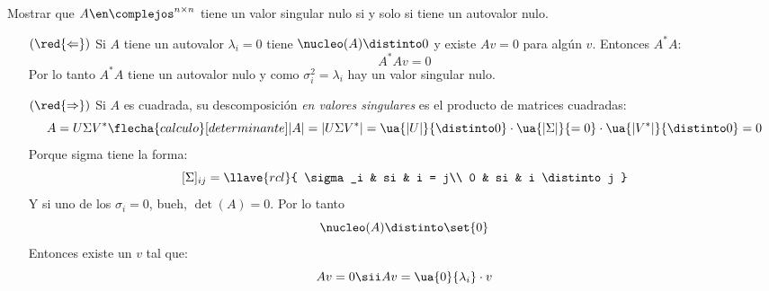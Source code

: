 \begin{enunciado}{\ejercicio}
  Mostrar que $A \en \complejos^{n \times n}$ tiene un valor singular nulo si y solo si tiene un autovalor nulo.
\end{enunciado}
\begin{itemize}
  \item[$(\red{\Leftarrow})$]
        Si $A$ tiene un autovalor $\lambda_i = 0$ tiene $\nucleo(A) \distinto 0$ y existe $Av = 0$ para algún $v$.
        Entonces $A^*A$:
        $$
          A^* A v = 0
        $$
        Por lo tanto $A^*A$ tiene un autovalor nulo y como $\sigma_i^2 = \lambda_i$ hay un valor singular nulo.

  \item[$(\red{\Rightarrow})$]
        Si $A$ es cuadrada, su descomposición \textit{en valores singulares} es el producto de matrices cuadradas:
        $$
          A = U \Sigma V^*
          \flecha{calculo}[determinante]
          |A| =
          |U \Sigma V^*| =
          \ua{|U|}{\distinto 0} \cdot \ua{|\Sigma|}{= 0} \cdot \ua{|V^*|}{\distinto 0} = 0
        $$
        Porque sigma tiene la forma:
        $$
          [\Sigma]_{ij} =
          \llave{rcl}{
            \sigma_i & si & i = j\\
            0 & si & i \distinto j
          }
        $$
        Y si uno de los $\sigma_i = 0$, bueh, $\det(A) = 0$. Por lo tanto
        $$
          \nucleo(A) \distinto \set{0}
        $$
        Entonces existe un $v$ tal que:
        $$
          Av = 0 \sii Av = \ua{0}{\lambda_i} \cdot v
        $$
\end{itemize}

\begin{aportes}
  \item {}
\end{aportes}
